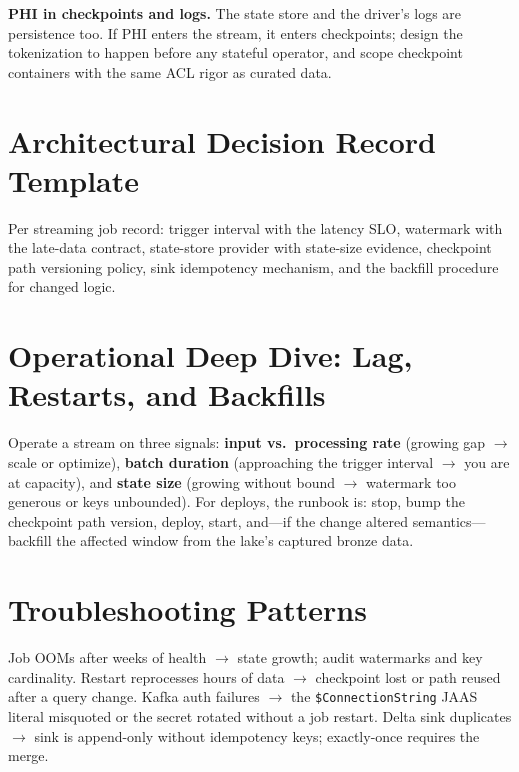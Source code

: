 \begin{pitfall}
\textbf{PHI in checkpoints and logs.} The state store and the driver's logs are persistence too. If PHI enters the stream, it enters checkpoints; design the tokenization to happen before any stateful operator, and scope checkpoint containers with the same ACL rigor as curated data.
\end{pitfall}

\section{Architectural Decision Record Template}
Per streaming job record: trigger interval with the latency SLO, watermark with the late-data contract, state-store provider with state-size evidence, checkpoint path versioning policy, sink idempotency mechanism, and the backfill procedure for changed logic.

\section{Operational Deep Dive: Lag, Restarts, and Backfills}
Operate a stream on three signals: \textbf{input vs.\ processing rate} (growing gap $\rightarrow$ scale or optimize), \textbf{batch duration} (approaching the trigger interval $\rightarrow$ you are at capacity), and \textbf{state size} (growing without bound $\rightarrow$ watermark too generous or keys unbounded). For deploys, the runbook is: stop, bump the checkpoint path version, deploy, start, and---if the change altered semantics---backfill the affected window from the lake's captured bronze data.

\section{Troubleshooting Patterns}
Job OOMs after weeks of health $\rightarrow$ state growth; audit watermarks and key cardinality. Restart reprocesses hours of data $\rightarrow$ checkpoint lost or path reused after a query change. Kafka auth failures $\rightarrow$ the \texttt{\$ConnectionString} JAAS literal misquoted or the secret rotated without a job restart. Delta sink duplicates $\rightarrow$ sink is append-only without idempotency keys; exactly-once requires the merge.

